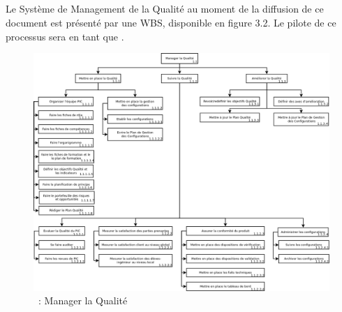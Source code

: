 \subsection{\WBSCourt{}}
Le Système de Management de la Qualité au moment de la diffusion de ce document est présenté par une WBS, disponible en figure 3.2.
Le pilote de ce processus sera \Pierre{} en tant que \RQ{}.
\newpage
\begin{figure}[H]
\centering
 \includegraphics[width=23cm,angle=90]{images/managerQualite.png}
 \caption{\WBSCourt{}~: Manager la Qualité}
 \label{WBS2}
\end{figure}

